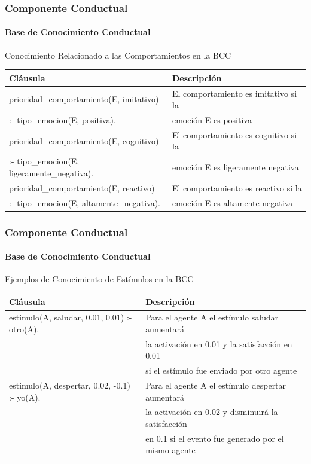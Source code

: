 \documentclass{beamer}
\begin{document}
\begin{frame}
\frametitle{Componente Conductual}
\framesubtitle{Base de Conocimiento Conductual}
\centering
Conocimiento Relacionado a las Comportamientos en la BCC
\begin{table}[!ht]
\centering
\tiny
\begin{tabular}{ll}
\hline
\scriptsize \bfseries Cláusula & \scriptsize \bfseries Descripción \\
\hline
\hline
prioridad\_comportamiento(E, imitativo) & El comportamiento es imitativo si la \\
:- tipo\_emocion(E, positiva). & emoción E es positiva \\\hline
prioridad\_comportamiento(E, cognitivo) & El comportamiento es cognitivo si la \\
:- tipo\_emocion(E, ligeramente\_negativa). & emoción E es ligeramente negativa \\\hline
prioridad\_comportamiento(E, reactivo) &  El comportamiento es reactivo si la  \\
:- tipo\_emocion(E, altamente\_negativa). & emoción E es altamente negativa \\
\hline
\end{tabular}
\end{table}
\end{frame}

\begin{frame}
\frametitle{Componente Conductual}
\framesubtitle{Base de Conocimiento Conductual}
\centering
Ejemplos de Conocimiento de Estímulos en la BCC
\begin{table}[!ht]
\centering
\tiny
\begin{tabular}{ll}
\hline
\scriptsize \bfseries Cláusula & \scriptsize \bfseries Descripción \\
\hline
\hline
estimulo(A, saludar, 0.01, 0.01) :- otro(A). & Para el agente A el estímulo saludar aumentará \\ & la activación en 0.01 y la satisfacción en 0.01 \\ & si el estímulo fue enviado por otro agente \\ \hline
estimulo(A, despertar, 0.02, -0.1) :- yo(A). & Para el agente A el estímulo despertar aumentará \\ & la activación en 0.02 y disminuirá la satisfacción \\ & en 0.1 si el evento fue generado por el mismo agente \\
\hline
\end{tabular}
\end{table}
\end{frame}
\end{document}
